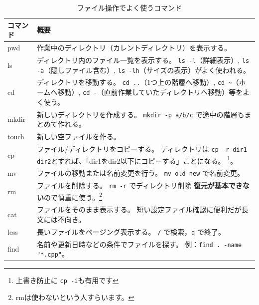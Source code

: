 \documentclass[12pt]{jreport}
\begin{document}
\begin{table}[H]
\label{table:command}
\centering
\caption{ファイル操作でよく使うコマンド}
\renewcommand{\arraystretch}{1.3}
\begin{tabularx}{\textwidth}{|l|X|}
\hline
\rowcolor{tableblue!20}
\textbf{コマンド} &  \textbf{概要} \\
\hline

pwd &
作業中のディレクトリ（カレントディレクトリ）を表示する。 \\
\hline

ls & 
ディレクトリ内のファイル一覧を表示する。
\texttt{ls -l}（詳細表示）, \texttt{ls -a}（隠しファイル含む）, \texttt{ls -lh}（サイズの表示）がよく使われる。 \\
\hline

cd & 
ディレクトリを移動する。
\texttt{cd ..}（1つ上の階層へ移動）, \texttt{cd \textasciitilde{}}（ホームへ移動）, \texttt{cd -}（直前作業していたディレクトリへ移動）等をよく使う。 \\
\hline

mkdir &
新しいディレクトリを作成する。
\texttt{mkdir -p a/b/c} で途中の階層もまとめて作れる。 \\
\hline

touch &
新しい空ファイルを作る。 \\
\hline

cp & 
ファイル/ディレクトリをコピーする。
ディレクトリは \texttt{cp -r dir1 dir2}とすれば、「dir1をdir2以下にコピーする」ことになる。
\footnote{上書き防止に \texttt{cp -i}も有用です}。 \\
\hline

mv &
ファイルの移動または名前変更を行う。
\texttt{mv old new} で名前変更。 \\
\hline

rm  &
ファイルを削除する。
\texttt{rm -r} でディレクトリ削除
\textbf{復元が基本できない}ので慎重に使う。\footnote{rmは使わないという人すらいます。} \\
\hline

cat &
ファイルをそのまま表示する。
短い設定ファイル確認に便利だが長文には不向き。 \\
\hline

less  &
長いファイルをページング表示する。
\texttt{/} で検索，\texttt{q} で終了。 \\
\hline

find  &
名前や更新日時などの条件でファイルを探す。
例：\texttt{find . -name "*.cpp"}。 \\
\hline

\end{tabularx}
\end{table}
\end{document}
